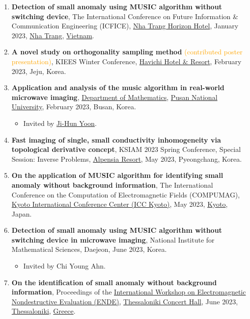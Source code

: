 \documentclass[10pt,A4]{article}
\begin{document}
\begin{enumerate}
\item\label{P-ICFICE2023} \textbf{Detection of small anomaly using MUSIC algorithm without switching device}, The  International Conference on Future Information \& Communication Engineering (ICFICE), \href{https://nhatranghorizon.com}{Nha Trang Horizon Hotel}, January 2023, \href{https://nhatrang.khanhhoa.gov.vn/english-page}{Nha Trang}, \href{https://vietnam.gov.vn}{Vietnam}.
\item\label{P-KIEES2023A} \textbf{A novel study on orthogonality sampling method} \textcolor{orange}{(contributed poster presentation)}, KIEES Winter Conference, \href{https://www.haevichi.com/jeju/en/}{Havichi Hotel \& Resort}, February 2023, Jeju, Korea.
\item\label{P-PNU2023} \textbf{Application and analysis of the music algorithm in real-world microwave imaging}, \href{https://math.pusan.ac.kr/math/index.do}{Department of Mathematics}, \href{https://www.pusan.ac.kr/}{Pusan National University}, February 2023, Busan, Korea.
\begin{itemize}
\item Invited by \href{https://fmath613.pusan.ac.kr/fmath613/index.do}{Ji-Hun Yoon}.
\end{itemize}
\item\label{P-KSIAM2023} \textbf{Fast imaging of single, small conductivity inhomogeneity via topological derivative concept}, KSIAM 2023 Spring Conference, Special Session: Inverse Problems, \href{https://www.alpensia.com/main.do}{Alpensia Resort}, May 2023, Pyeongchang, Korea.
\item\label{C-COMPUMAG2023} \textbf{On the application of MUSIC algorithm for identifying small anomaly without background information}, The  International Conference on the Computation of Electromagnetic Fields (COMPUMAG), \href{https://www.icckyoto.or.jp/en/}{Kyoto International Conference Center (ICC Kyoto)}, May 2023, \href{https://www.city.kyoto.lg.jp}{Kyoto}, Japan.
\item\label{P-NIMS2023A} \textbf{Detection of small anomaly using MUSIC algorithm without switching device in microwave imaging}, National Institute for Mathematical Sciences, Daejeon, June 2023, Korea.
    \begin{itemize}
\item Invited by Chi Young Ahn.
\end{itemize}
\item\label{P-ENDE2023} \textbf{On the identification of small anomaly without background information}, Proceedings of the \href{https://www.ende2023.gr}{ International Workshop on Electromagnetic Nondestructive Evaluation (ENDE)}, \href{https://www.tch.gr/default.aspx?lang=en-GB&page=1}{Thessaloniki Concert Hall}, June 2023, \href{https://thessaloniki.travel}{Thessaloniki}, \href{https://www.visitgreece.gr}{Greece}.

\end{enumerate}
\end{document}
